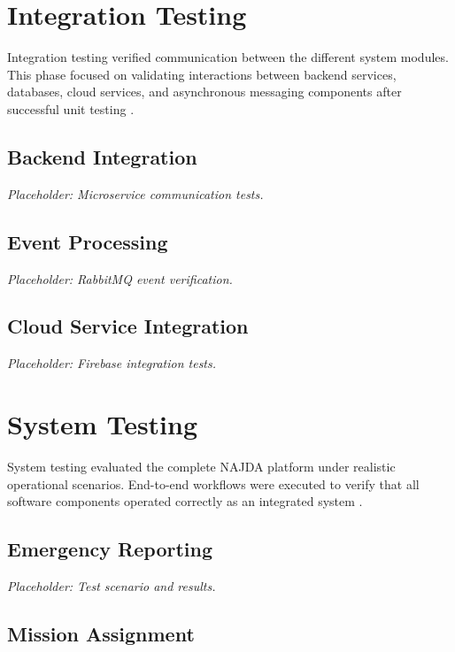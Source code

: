 \section{Integration Testing}

Integration testing verified communication between the different system modules. This phase focused on validating interactions between backend services, databases, cloud services, and asynchronous messaging components after successful unit testing \cite{pressman2020se}.

\subsection{Backend Integration}

\textit{Placeholder: Microservice communication tests.}

\subsection{Event Processing}

\textit{Placeholder: RabbitMQ event verification.}

\subsection{Cloud Service Integration}

\textit{Placeholder: Firebase integration tests.}


\section{System Testing}

System testing evaluated the complete NAJDA platform under realistic operational scenarios. End-to-end workflows were executed to verify that all software components operated correctly as an integrated system \cite{sommerville2016software}.

\subsection{Emergency Reporting}

\textit{Placeholder: Test scenario and results.}

\subsection{Mission Assignment}

